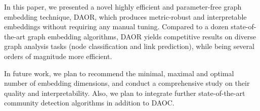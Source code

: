 \documentclass[conference]{IEEEtran}
\newcommand{\sys}{DAOR\xspace}
\begin{document}
In this paper, we presented a novel highly efficient and parameter-free graph embedding technique, \sys\hspace{-4pt}, which produces metric-robust and interpretable embeddings without requiring any manual tuning. Compared to a dozen state-of-the-art graph embedding algorithms, \sys yields competitive results on diverse graph analysis tasks (node classification and link prediction), while being several orders of magnitude more efficient. 


In future work, we plan to recommend the minimal, maximal and optimal number of embedding dimensions, and conduct a comprehensive study on their quality and interpretability. Also, we plan to integrate further state-of-the-art community detection algorithms in addition to DAOC.






\balance

\end{document}
